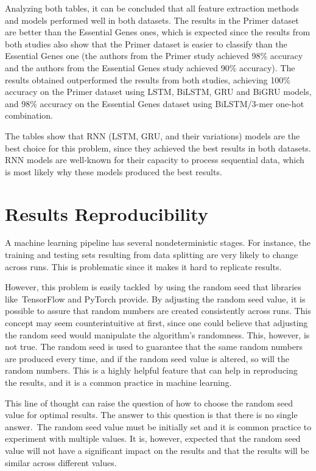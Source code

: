 Analyzing both tables, it can be concluded that all feature extraction methods and models performed well in both datasets. The results in the Primer dataset are better than the Essential Genes ones, which is expected since the results from both studies also show that the Primer dataset is easier to classify than the Essential Genes one (the authors from the Primer study achieved 98\% accuracy and the authors from the Essential Genes study achieved 90\% accuracy). The results obtained outperformed the results from both studies, achieving 100\% accuracy on the Primer dataset using \gls{LSTM}, BiLSTM, \gls{GRU} and BiGRU models, and 98\% accuracy on the Essential Genes dataset using BiLSTM/3-mer one-hot combination. 

The tables show that \gls{RNN} (\gls{LSTM}, \gls{GRU}, and their variations) models are the best choice for this problem, since they achieved the best results in both datasets. \gls{RNN} models are well-known for their capacity to process sequential data, which is most likely why these models produced the best results.

\section{Results Reproducibility}

A machine learning pipeline has several nondeterministic stages. For instance, the training and testing sets resulting from data splitting are very likely to change across runs. This is problematic since it makes it hard to replicate results.

However, this problem is easily tackled by using the random seed that libraries like TensorFlow and PyTorch provide. By adjusting the random seed value, it is possible to assure that random numbers are created consistently across runs. This concept may seem counterintuitive at first, since one could believe that adjusting the random seed would manipulate the algorithm's randomness. This, however, is not true. The random seed is used to guarantee that the same random numbers are produced every time, and if the random seed value is altered, so will the random numbers. This is a highly helpful feature that can help in reproducing the results, and it is a common practice in machine learning.

This line of thought can raise the question of how to choose the random seed value for optimal results. The answer to this question is that there is no single answer. The random seed value must be initially set and it is common practice to experiment with multiple values. It is, however, expected that the random seed value will not have a significant impact on the results and that the results will be similar across different values.

